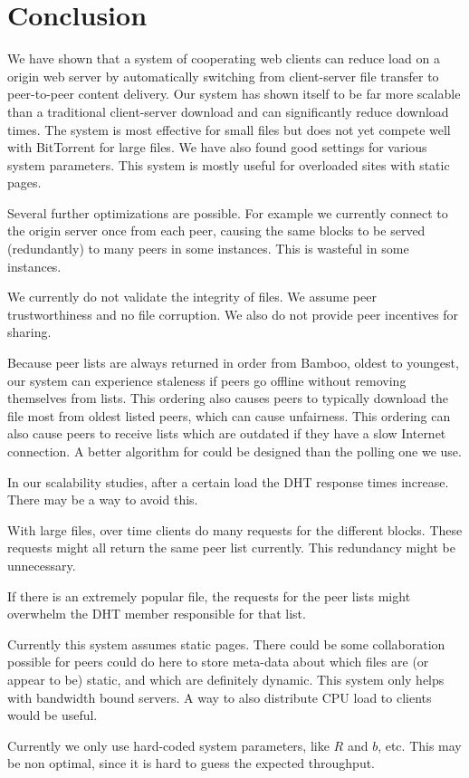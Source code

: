 \section{Conclusion}

We have shown that a system of cooperating web clients can reduce load on a origin web server by automatically switching
from client-server file transfer to peer-to-peer content delivery. Our system has shown itself to be far more scalable 
than a traditional client-server download and can significantly
reduce download times.  The system is most effective for small files but does not yet compete well with
BitTorrent for large files.  We have also found good settings for various system parameters.  This system is mostly useful
for overloaded sites with static pages.

Several further optimizations are possible.  For example we currently connect to the origin
server once from each peer, causing the same blocks to be served (redundantly) to many peers in some instances.
This is wasteful in some instances.

We currently do not validate the integrity of files.  We assume peer trustworthiness and no file corruption.  
We also do not provide peer incentives for sharing.

Because peer lists are always returned in order from Bamboo, oldest to youngest, our system can experience staleness if peers
go offline without removing themselves from lists.  This ordering also causes peers to typically download the file
most from oldest listed peers, which can cause unfairness. This ordering can also cause peers to receive lists which
are outdated if they have a slow Internet connection.  A better algorithm for
could be designed than the polling one we use.

In our scalability studies, after a certain load the DHT response times increase.  There may be a way to avoid this.

With large files, over time clients do many requests for the different blocks.  These requests might all return the same
peer list currently.  This redundancy might be unnecessary.

If there is an extremely popular file, the requests for the peer lists might overwhelm the DHT member responsible
for that list.

Currently this system assumes static pages.  There could be some collaboration possible for peers 
could do here to store meta-data about which files are (or appear to be) static, and which are definitely dynamic.
This system only helps with bandwidth bound servers.  A way to also distribute CPU load to clients would be useful.

Currently we only use hard-coded system parameters, like $R$ and $b$, etc.  This may be non optimal, since it is hard
to guess the expected throughput.